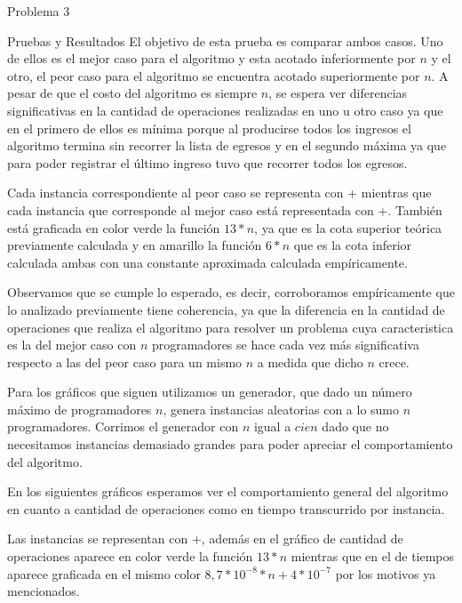 \begin{section}{Problema 3}
\begin{subsection}{Pruebas y Resultados}
	El objetivo de esta prueba es comparar ambos casos. Uno de ellos es el mejor caso para el algoritmo y esta acotado inferiormente por $n$ y el otro, el peor caso para el algoritmo se encuentra acotado superiormente por $n$. A pesar de que el costo del algoritmo es siempre $n$, se espera ver diferencias significativas en la cantidad de operaciones realizadas en uno u otro caso ya que en el primero de ellos es mínima porque al producirse todos los ingresos el algoritmo termina sin recorrer la lista de egresos y en el segundo máxima ya que para poder registrar el último ingreso tuvo que recorrer todos los egresos.
	
	Cada instancia correspondiente al peor caso se representa con {\color{red}+} mientras que cada instancia que corresponde al mejor caso está representada con {\color{blue}+}. También está graficada en color verde la función $13*n$, ya que es la cota superior teórica previamente calculada y en amarillo la función $6*n$ que es la cota inferior calculada ambas con una constante aproximada calculada empíricamente.\VSP
	
	\VSP

	Observamos que se cumple lo esperado, es decir, corroboramos empíricamente que lo analizado previamente tiene coherencia, ya que la diferencia en la cantidad de operaciones que realiza el algoritmo para resolver un problema cuya caracteristica es la del mejor caso con $n$ programadores se hace cada vez más significativa respecto a las del peor caso para un mismo $n$ a medida que dicho $n$ crece.
	
	Para los gráficos que siguen utilizamos un generador, que dado un número máximo de programadores $n$, genera instancias aleatorias con a lo sumo $n$ programadores. Corrimos el generador con $n$ igual a $cien$ dado que no necesitamos instancias demasiado grandes para poder apreciar el comportamiento del algoritmo.

	En los siguientes gráficos esperamos ver el comportamiento general del algoritmo en cuanto a cantidad de operaciones como en tiempo transcurrido por instancia.
	
	Las instancias se representan con {\color{red}+}, además en el gráfico de cantidad de operaciones aparece en color verde la función $13*n$ mientras que en el de tiempos aparece graficada en el mismo color $8,7*10^{-8}*n+4*10^{-7}$ por los motivos ya mencionados.\VSP

	\VSP
	

\end{subsection}
\end{section}

